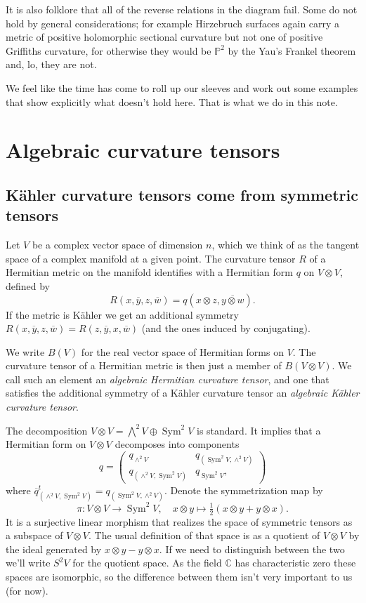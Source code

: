 \documentclass[10pt,a4paper]{amsart}
\theoremstyle{definition}
\def\ov#1{\overline{#1}}
\newcommand{\kk}[1]{\mathbb{#1}}
\DeclareMathOperator{\Sym}{Sym}
\begin{document}
It is also folklore that all of the reverse relations in the diagram fail.
Some do not hold by general considerations; for example Hirzebruch surfaces
again carry a metric of positive holomorphic sectional curvature but not one of
positive Griffiths curvature, for otherwise they would be $\kk P^2$ by the
Yau's Frankel theorem and, lo, they are not.

We feel like the time has come to roll up our sleeves and work out some
examples that show explicitly what doesn't hold here.
That is what we do in this note.



\section{Algebraic curvature tensors}



\subsection*{K\"ahler curvature tensors come from symmetric tensors}

Let $V$ be a complex vector space of dimension $n$, which we think of as the
tangent space of a complex manifold at a given point.
The curvature tensor $R$ of a Hermitian metric on the manifold identifies with
a Hermitian form $q$ on $V \otimes V$, defined by
$$
R(x, \ov y, z, \ov w)
= q(x \otimes z, \ov{y \otimes w}).
$$
If the metric is K\"ahler we get an additional symmetry
$R(x, \ov y, z, \ov w) = R(z, \ov y, x, \ov w)$
(and the ones induced by conjugating).

We write $B(V)$ for the real vector space of Hermitian forms on $V$.
The curvature tensor of a Hermitian metric is then just a member of $B(V
\otimes V)$. We call such an element an \emph{algebraic Hermitian curvature
tensor}, and one that satisfies the additional symmetry of a K\"ahler curvature
tensor an \emph{algebraic K\"ahler curvature tensor}.

The decomposition $V \otimes V = \bigwedge^2 V \oplus \Sym^2 V$ is standard.
It implies that a Hermitian form on $V \otimes V$ decomposes into components
$$
q = \begin{pmatrix}
q_{\wedge^2 V} & q_{(\Sym^2V, \wedge^2 V)}
\\
q_{(\wedge^2 V, \Sym^2V)} & q_{\Sym^2 V},
\end{pmatrix}
$$
where $\ov{q}_{(\wedge^2 V, \Sym^2V)}^t = q_{(\Sym^2V, \wedge^2 V)}$.
Denote the symmetrization map by
$$
\pi : V \otimes V \to \Sym^2 V,
\quad
x \otimes y \mapsto \tfrac 12 (x \otimes y + y \otimes x).
$$
It is a surjective linear morphism that realizes the space of symmetric tensors
as a subspace of $V \otimes V$.
The usual definition of that space is as a quotient of $V \otimes V$ by the
ideal generated by $x \otimes y - y \otimes x$.
If we need to distinguish between the two we'll write $S^2V$ for the quotient
space.
As the field $\kk C$ has characteristic zero these spaces are isomorphic,
so the difference between them isn't very important to us (for now).
\end{document}
